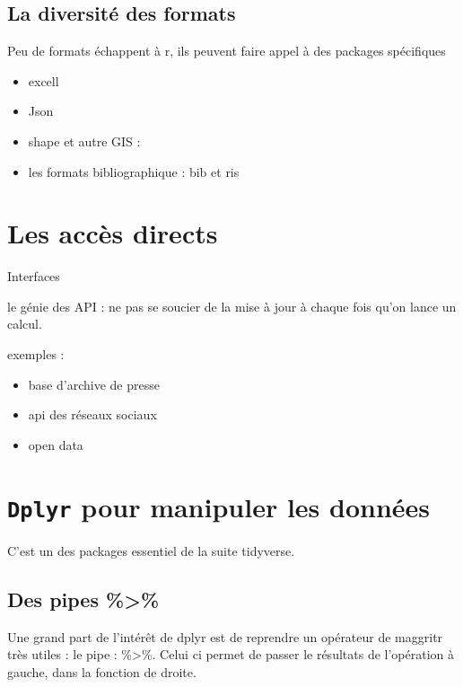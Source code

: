 \documentclass[
]{book}
\providecommand{\tightlist}{%
  \setlength{\itemsep}{0pt}\setlength{\parskip}{0pt}}
\begin{document}
\hypertarget{la-diversituxe9-des-formats}{%
\subsection{La diversité des formats}\label{la-diversituxe9-des-formats}}

Peu de formats échappent à r, ils peuvent faire appel à des packages spécifiques

\begin{itemize}
\tightlist
\item
  excell
\item
  Json
\item
  shape et autre GIS :
\item
  les formats bibliographique : bib et ris
\end{itemize}

\hypertarget{les-accuxe8s-directs}{%
\section{Les accès directs}\label{les-accuxe8s-directs}}

Interfaces

le génie des API : ne pas se soucier de la mise à jour à chaque fois qu'on lance un calcul.

exemples :

\begin{itemize}
\tightlist
\item
  base d'archive de presse
\item
  api des réseaux sociaux
\item
  open data
\end{itemize}

\hypertarget{dplyr-pour-manipuler-les-donnuxe9es}{%
\section{\texorpdfstring{\texttt{Dplyr} pour manipuler les données}{Dplyr pour manipuler les données}}\label{dplyr-pour-manipuler-les-donnuxe9es}}

C'est un des packages essentiel de la suite tidyverse.

\hypertarget{des-pipes}{%
\subsection{Des pipes \%\textgreater\%}\label{des-pipes}}

Une grand part de l'intérêt de dplyr est de reprendre un opérateur de maggritr très utiles : le pipe : \%\textgreater\%. Celui ci permet de passer le résultats de l'opération à gauche, dans la fonction de droite.
\end{document}
